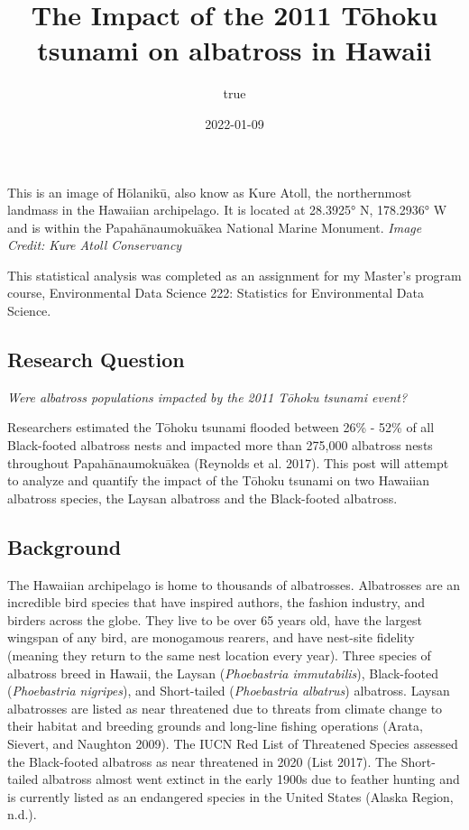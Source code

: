 \documentclass[
]{article}
\title{The Impact of the 2011 Tōhoku tsunami on albatross in Hawaii}
\author{true}
\date{2022-01-09}
\begin{document}
\maketitle

This is an image of Hōlanikū, also know as Kure Atoll, the northernmost
landmass in the Hawaiian archipelago. It is located at 28.3925° N,
178.2936° W and is within the Papahānaumokuākea National Marine
Monument. \emph{Image Credit: Kure Atoll Conservancy}

This statistical analysis was completed as an assignment for my Master's
program course, Environmental Data Science 222: Statistics for
Environmental Data Science.

\hypertarget{research-question}{%
\subsection{Research Question}\label{research-question}}

\emph{Were albatross populations impacted by the 2011 Tōhoku tsunami
event?}

Researchers estimated the Tōhoku tsunami flooded between 26\% - 52\% of
all Black-footed albatross nests and impacted more than 275,000
albatross nests throughout Papahānaumokuākea (Reynolds et al. 2017).
This post will attempt to analyze and quantify the impact of the Tōhoku
tsunami on two Hawaiian albatross species, the Laysan albatross and the
Black-footed albatross.

\hypertarget{background}{%
\subsection{Background}\label{background}}

The Hawaiian archipelago is home to thousands of albatrosses.
Albatrosses are an incredible bird species that have inspired authors,
the fashion industry, and birders across the globe. They live to be over
65 years old, have the largest wingspan of any bird, are monogamous
rearers, and have nest-site fidelity (meaning they return to the same
nest location every year). Three species of albatross breed in Hawaii,
the Laysan (\emph{Phoebastria immutabilis}), Black-footed
(\emph{Phoebastria nigripes}), and Short-tailed (\emph{Phoebastria
albatrus}) albatross. Laysan albatrosses are listed as near threatened
due to threats from climate change to their habitat and breeding grounds
and long-line fishing operations (Arata, Sievert, and Naughton 2009).
The IUCN Red List of Threatened Species assessed the Black-footed
albatross as near threatened in 2020 (List 2017). The Short-tailed
albatross almost went extinct in the early 1900s due to feather hunting
and is currently listed as an endangered species in the United States
(Alaska Region, n.d.).
\end{document}
